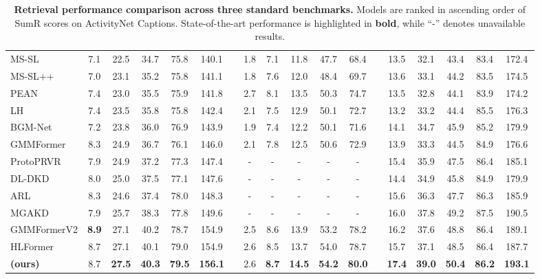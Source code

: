 \begin{table}[t]
{\begin{tabular}{l ccccc c ccccc c  ccccc}
MS-SL \cite{ms-sl}& 7.1 & 22.5 & 34.7 & 75.8 & 140.1 &&1.8 & 7.1 & 11.8 & 47.7 & 68.4& & 13.5 & 32.1 & 43.4 & 83.4 & 172.4       \\
MS-SL++ \cite{MS-SL++}& 7.0 & 23.1 & 35.2 & 75.8 & 141.1 && 1.8 & 7.6 & 12.0 & 48.4 & 69.7 && 13.6 & 33.1 & 44.2 & 83.5 & 174.5\\
 PEAN \cite{PEAN}&7.4 & 23.0 & 35.5 & 75.9 & 141.8 &&  2.7 & 8.1 & 13.5 & 50.3 & 74.7 && 13.5 & 32.8 & 44.1 & 83.9 & 174.2 \\
  LH \cite{lh}& 7.4 & 23.5 & 35.8 & 75.8 & 142.4 &&2.1 & 7.5 & 12.9 & 50.1 & 72.7& & 13.2 & 33.2 & 44.4 & 85.5 & 176.3 \\
 BGM-Net \cite{bgmnet}& 7.2 & 23.8 & 36.0 & 76.9 & 143.9 &&1.9 & 7.4 & 12.2 & 50.1 & 71.6 && 14.1 & 34.7 & 45.9 & 85.2 & 179.9 \\
 GMMFormer \cite{GMMFORMER}&8.3 & 24.9 & 36.7 & 76.1 & 146.0 && 2.1 & 7.8 & 12.5 & 50.6 & 72.9 &&13.9 & 33.3 & 44.5 & 84.9 & 176.6 \\
 ProtoPRVR \cite{ProtoPRVR} & 7.9 & 24.9 & 37.2 & 77.3 & 147.4 && - & - & - & - & - && 15.4 & 35.9 & 47.5 & 86.4 & 185.1\\
 DL-DKD \cite{DL-DKD}& 8.0 & 25.0 & 37.5 & 77.1 & 147.6 &&- & - & - & - & - && 14.4 & 34.9 & 45.8 & 84.9 & 179.9  \\
ARL \cite{ARL}& 8.3 & 24.6 & 37.4 & 78.0 & 148.3 && - & - & - & - & - && 15.6 & 36.3 & 47.7 & 86.3 & 185.9\\
MGAKD \cite{MGAKD}& 7.9 & 25.7 & 38.3 & 77.8 & 149.6 && - & - & - & - & - && 16.0 & 37.8 & 49.2 & 87.5 & 190.5\\
GMMFormerV2 \cite{GMMFormerV2}& \textbf{8.9} & 27.1 & 40.2 & 78.7 & 154.9 && 2.5 & 8.6 & 13.9 & 53.2 & 78.2 && 16.2 & 37.6 & 48.8 & 86.4 & 189.1\\
HLFormer \cite{HLFormer}& 8.7 & 27.1 & 40.1 & 79.0 & 154.9 && 2.6 & 8.5 & 13.7 & 54.0 & 78.7 && 15.7 & 37.1 & 48.5 & 86.4 & 187.7\\
\rowcolor{ourscolor}
 \textbf{ (ours)} & 8.7 & \textbf{27.5} & \textbf{40.3} & \textbf{79.5} & \textbf{156.1} &&2.6 & \textbf{8.7} & \textbf{14.5} & \textbf{54.2} & \textbf{80.0} &&   \textbf{17.4} & \textbf{39.0} & \textbf{50.4} & \textbf{86.2} & \textbf{193.1}     \\
\hline
\bottomrule
\end{tabular}
}
\vspace{-.8em}
\caption{\textbf{Retrieval performance comparison across three standard benchmarks.} Models are ranked in ascending order of SumR scores on ActivityNet Captions.
State-of-the-art performance is highlighted in \textbf{bold}, while “-” denotes unavailable results.}
\vspace{-1.5em}
\label{tab:main}
\end{table}


